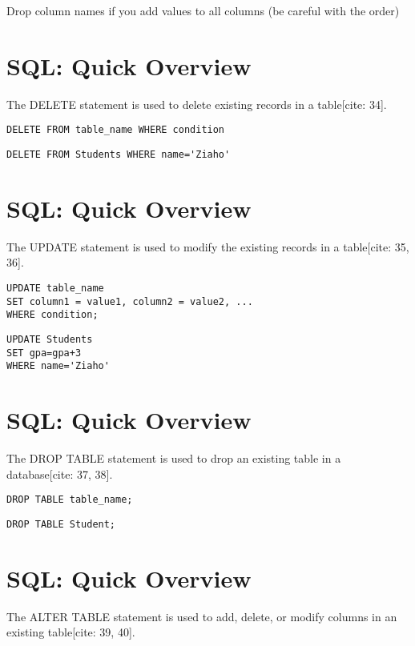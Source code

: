 \documentclass{article}
\begin{document}
Drop column names if you add values to all columns (be careful with the order)

\section*{SQL: Quick Overview}

The DELETE statement is used to delete existing records in a table[cite: 34].

\begin{verbatim}
DELETE FROM table_name WHERE condition
\end{verbatim}

\begin{verbatim}
DELETE FROM Students WHERE name='Ziaho'
\end{verbatim}

\section*{SQL: Quick Overview}

The UPDATE statement is used to modify the existing records in a table[cite: 35, 36].

\begin{verbatim}
UPDATE table_name
SET column1 = value1, column2 = value2, ...
WHERE condition;
\end{verbatim}

\begin{verbatim}
UPDATE Students
SET gpa=gpa+3
WHERE name='Ziaho'
\end{verbatim}

\section*{SQL: Quick Overview}

The DROP TABLE statement is used to drop an existing table in a database[cite: 37, 38].

\begin{verbatim}
DROP TABLE table_name;
\end{verbatim}

\begin{verbatim}
DROP TABLE Student;
\end{verbatim}

\section*{SQL: Quick Overview}

The ALTER TABLE statement is used to add, delete, or modify columns in an existing table[cite: 39, 40].
\end{document}
